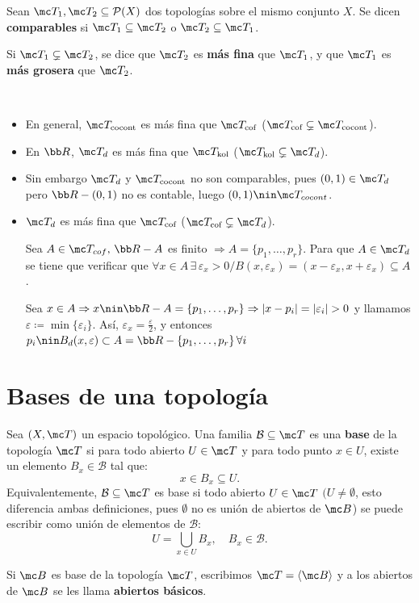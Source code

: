 \begin{defi} Sean \(\mc T_1, \mc T_2 \subseteq \mathcal{P}(X)\) dos topologías sobre el mismo conjunto \(X\). Se dicen \textbf{comparables} si \(\mc T_1 \subseteq \mc T_2\) o \(\mc T_2 \subseteq \mc T_1\).

Si \(\mc T_1 \subsetneq \mc T_2\), se dice que \(\mc T_2\) es \textbf{más fina} que \(\mc T_1\), y que \(\mc T_1\) es \textbf{más grosera} que \(\mc T_2\).
\end{defi}
\begin{ejems} \,
    \begin{itemize}
    \item En general, \(\mc T_{\text{cocont}}\) es más fina que \(\mc T_{\text{cof}}\) ($\mc T_{\text{cof}} \subsetneq \mc T_{\text{cocont}}$).
    \item En $\bb R$, \(\mc T_d\) es más fina que \(\mc T_{\text{kol}}\) ($\mc T_{\text{kol}} \subsetneq \mc T_d$).  
    \item Sin embargo \(\mc T_d\) y \(\mc T_{\text{cocont}}\) no son comparables, pues $(0,1)\in \mc T_d$ pero $\bb R- (0,1)$ no es contable, luego $(0,1) \nin \mc T_{cocont}$.  
    \item \(\mc T_d\) es más fina que \(\mc T_{\text{cof}}\) ($\mc T_{\text{cof}} \subsetneq\mc T_{d}$).
    \begin{dem}
        Sea $A \in \mc T_{cof}, \, \bb R-A$ es finito $\Rightarrow A=\{p_1, \ldots, p_r\}$. Para que $A\in \mc T_d$ se tiene que verificar que $\forall x\in A \, \exists \, \varepsilon_x > 0 / B(x,\varepsilon_x) = (x-\varepsilon_x, x+\varepsilon_x) \subseteq A$. 

        Sea $x \in A\Rightarrow x\nin \bb R-A = \{p_1, \ldots, p_r\} \Rightarrow |x-p_i|=|\varepsilon_i| > 0 $ y llamamos $\varepsilon\coloneqq \min \{\varepsilon_i\}$. As\'i, $\varepsilon_x = \frac{\varepsilon}{2}$, y entonces $p_i\nin B_d(x,\varepsilon) \subset A = \bb R - \{p_1, \ldots, p_r\} \, \forall i$
    \end{dem}
    \end{itemize}
\end{ejems}

\section{Bases de una topología}

\begin{defi}
Sea \((X, \mc T)\) un espacio topológico. Una familia \(\mathcal{B} \subseteq \mc T\) es una \textbf{base} de la topología \(\mc T\) si para todo abierto \(U \in \mc T\) y para todo punto \(x \in U\), existe un elemento \(B_x \in \mathcal{B}\) tal que:
\[
    x \in B_x \subseteq U \text{}.
\]
Equivalentemente, \(\mathcal{B} \subseteq \mc T\) es base si todo abierto \(U \in \mc T\) $(U\neq \emptyset$, esto diferencia ambas definiciones, pues $\emptyset$ no es uni\'on de abiertos de $\mc B$) se puede escribir como unión de elementos de \(\mathcal{B}\):
\[
    U = \bigcup_{x \in U} B_x, \quad B_x \in \mathcal{B} \text{}.
\]

Si $\mc B$ es base de la topolog\'ia $\mc T$, escribimos $\mc T = \langle \mc B \rangle$ y a los abiertos de $\mc B$ se les llama \textbf{abiertos básicos}.
\end{defi}

